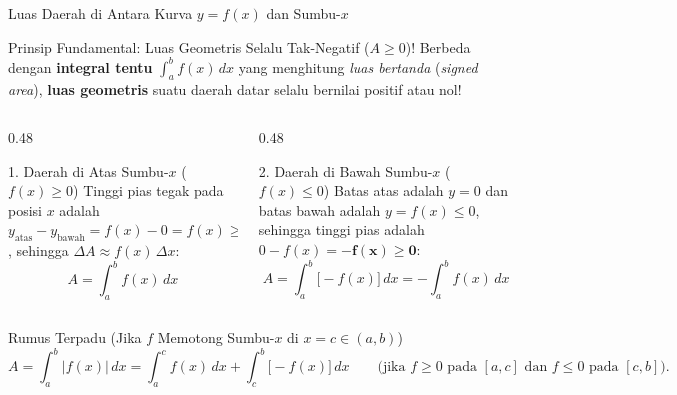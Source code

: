 \documentclass[aspectratio=43,10pt]{beamer}
\begin{document}
\begin{frame}{Luas Daerah di Antara Kurva $y = f(x)$ dan Sumbu-$x$}
    \begin{alertblock}{Prinsip Fundamental: Luas Geometris Selalu Tak-Negatif ($A \ge 0$)!}
        \scriptsize
        Berbeda dengan \textbf{integral tentu} $\int_a^b f(x)\,dx$ yang menghitung \textit{luas bertanda} (\textit{signed area}), \textbf{luas geometris} suatu daerah datar selalu bernilai positif atau nol!
    \end{alertblock}

    \begin{columns}[T]
        \begin{column}{0.48\textwidth}
            \begin{exampleblock}{1. Daerah di Atas Sumbu-$x$ ($f(x) \ge 0$)}
                \scriptsize\abovedisplayskip=3pt\belowdisplayskip=3pt
                Tinggi pias tegak pada posisi $x$ adalah $y_{\text{atas}} - y_{\text{bawah}} = f(x) - 0 = f(x) \ge 0$, sehingga $\Delta A \approx f(x)\,\Delta x$:
                $$\boxed{\;A = \int_{a}^{b} f(x)\,dx\;}$$
            \end{exampleblock}
        \end{column}

        \begin{column}{0.48\textwidth}
            \begin{block}{2. Daerah di Bawah Sumbu-$x$ ($f(x) \le 0$)}
                \scriptsize\abovedisplayskip=3pt\belowdisplayskip=3pt
                Batas atas adalah $y = 0$ dan batas bawah adalah $y = f(x) \le 0$, sehingga tinggi pias adalah $0 - f(x) = \mathbf{-f(x) \ge 0}$:
                $$\boxed{\;A = \int_{a}^{b} \big[-f(x)\big]\,dx = -\int_{a}^{b} f(x)\,dx\;}$$
            \end{block}
        \end{column}
    \end{columns}

    \vskip 2pt
    \begin{block}{Rumus Terpadu (Jika $f$ Memotong Sumbu-$x$ di $x = c \in (a,b)$)}
        \scriptsize\abovedisplayskip=2pt\belowdisplayskip=2pt
        $$A = \int_{a}^{b} |f(x)|\,dx = \int_{a}^{c} f(x)\,dx + \int_{c}^{b} \big[-f(x)\big]\,dx \qquad \text{(jika $f \ge 0$ pada $[a,c]$ dan $f \le 0$ pada $[c,b]$).}$$
    \end{block}
\end{frame}
\end{document}
